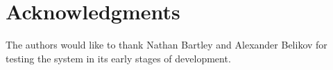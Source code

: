\documentclass[sigconf]{acmart}
\begin{document}









\section*{Acknowledgments}


The authors would like to thank Nathan Bartley and Alexander Belikov for testing the system in its early stages of development.





\end{document}
